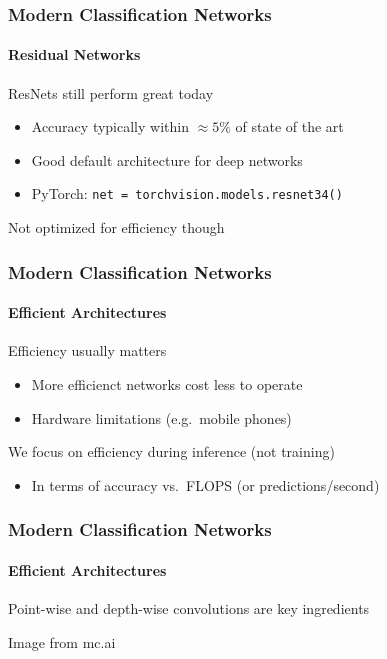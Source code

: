 \documentclass[xetex,professionalfont]{beamer}
\renewcommand\emph[1]{\textcolor{tuwcvl_cvl_blue}{#1}}
\begin{document}
\begin{frame}
	\frametitle{Modern Classification Networks}
	\framesubtitle{Residual Networks}

	ResNets still perform great today
	\begin{itemize}
		\item Accuracy typically within $\approx 5\%$ of state of the art
		\item Good default architecture for deep networks
		\item PyTorch: \texttt{net = torchvision.models.resnet34()}
	\end{itemize}

	\bigskip
	Not optimized for efficiency though

\end{frame}


\begin{frame}
	\frametitle{Modern Classification Networks}
	\framesubtitle{Efficient Architectures}

	Efficiency usually matters
	\begin{itemize}
		\item More efficienct networks cost less to operate
		\item Hardware limitations (e.g.~mobile phones)
	\end{itemize}

	\bigskip

	We focus on efficiency during \emph{inference} (not training)
	\begin{itemize}
		\item In terms of accuracy vs.~FLOPS (or predictions/second)
	\end{itemize}

\end{frame}


\begin{frame}
	\frametitle{Modern Classification Networks}
	\framesubtitle{Efficient Architectures}

	Point-wise and \emph{depth-wise} convolutions are key ingredients %

	\smallskip

	\begin{center}
		{\centering Image from mc.ai}
	\end{center}

\end{frame}
\end{document}
